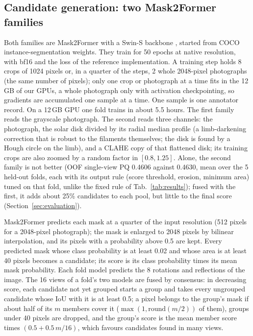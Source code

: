 \documentclass[sigconf]{acmart}
\begin{document}
\subsection{Candidate generation: two Mask2Former families}\label{sec:candidates}
Both families are Mask2Former \cite{cheng2022mask2former} with a Swin-S backbone \cite{liu2021swin}, started from COCO \cite{lin2014coco} instance-segmentation weights. They train for 50 epochs at native resolution, with bf16 and the loss of the reference implementation. A training step holds 8 crops of 1024 pixels or, in a quarter of the steps, 2 whole 2048-pixel photographs (the same number of pixels); only one crop or photograph at a time fits in the 12\,GB of our GPUs, a whole photograph only with activation checkpointing, so gradients are accumulated one sample at a time. One sample is one annotator record. On a 12\,GB GPU one fold trains in about 5.5 hours. The first family reads the grayscale photograph. The second reads three channels: the photograph, the solar disk divided by its radial median profile (a limb-darkening correction that is robust to the filaments themselves; the disk is found by a Hough circle on the limb), and a CLAHE \cite{zuiderveld1994clahe} copy of that flattened disk; its training crops are also zoomed by a random factor in $[0.8, 1.25]$. Alone, the second family is not better (OOF single-view PQ 0.4606 against 0.4630, mean over the 5 held-out folds, each with its output rule (score threshold, erosion, minimum area) tuned on that fold, unlike the fixed rule of Tab.~\ref{tab:results}); fused with the first, it adds about 25\% candidates to each pool, but little to the final score (Section~\ref{sec:evaluation}).

Mask2Former predicts each mask at a quarter of the input resolution (512 pixels for a 2048-pixel photograph); the mask is enlarged to 2048 pixels by bilinear interpolation, and its pixels with a probability above 0.5 are kept. Every predicted mask whose class probability is at least 0.02 and whose area is at least 40 pixels becomes a candidate; its score is its class probability times its mean mask probability. Each fold model predicts the 8 rotations and reflections of the image. The 16 views of a fold's two models are fused by consensus: in decreasing score, each candidate not yet grouped starts a group and takes every ungrouped candidate whose IoU with it is at least 0.5; a pixel belongs to the group's mask if about half of its $m$ members cover it ($\max(1, \mathrm{round}(m/2))$ of them), groups under 40 pixels are dropped, and the group's score is the mean member score times $(0.5 + 0.5\,m/16)$, which favours candidates found in many views.
\end{document}

